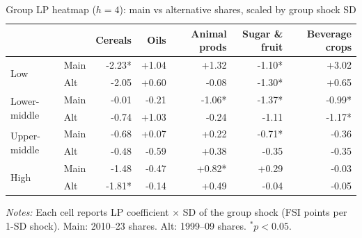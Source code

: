 \begin{table}[htbp]
\centering
\caption{Group LP heatmap ($h=4$): main vs alternative shares, scaled by group shock SD}
\label{tab:altshares-heatmap}
\begin{threeparttable}\small
\begin{tabular}{llrrrrr}
\toprule
 & & Cereals & Oils & Animal prods & Sugar \& fruit & Beverage crops \\
\midrule
\multirow{2}{*}{Low} & Main &-2.23* & +1.04 & +1.32 & -1.10* & +3.02 \\
& Alt &-2.05 & +0.60 & -0.08 & -1.30* & +0.65 \\[3pt]
\multirow{2}{*}{Lower-middle} & Main &-0.01 & -0.21 & -1.06* & -1.37* & -0.99* \\
& Alt &-0.74 & +1.03 & -0.24 & -1.11 & -1.17* \\[3pt]
\multirow{2}{*}{Upper-middle} & Main &-0.68 & +0.07 & +0.22 & -0.71* & -0.36 \\
& Alt &-0.48 & -0.59 & +0.38 & -0.35 & -0.35 \\[3pt]
\multirow{2}{*}{High} & Main &-1.48 & -0.47 & +0.82* & +0.29 & -0.03 \\
& Alt &-1.81* & -0.14 & +0.49 & -0.04 & -0.05 \\[3pt]
\bottomrule
\end{tabular}
\begin{tablenotes}\small
\item \textit{Notes:} Each cell reports LP coefficient $\times$ SD of the group shock (FSI points per 1-SD shock). Main: 2010--23 shares. Alt: 1999--09 shares. $^{*}p<0.05$.
\end{tablenotes}\end{threeparttable}\end{table}
